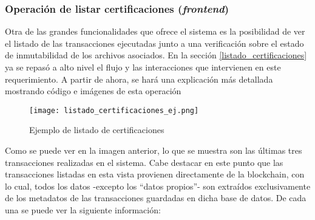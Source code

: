 \subsubsection{Operación de listar certificaciones (\textit{frontend})}

Otra de las grandes funcionalidades que ofrece el sistema es la posibilidad de ver el listado de las transacciones ejecutadas junto a una verificación sobre el estado de inmutabilidad de los archivos asociados. En la sección \ref{listado_certificaciones} ya se repasó a alto nivel el flujo y las interacciones que intervienen en este requerimiento. A partir de ahora, se hará una explicación más detallada mostrando código e imágenes de esta operación

\begin{figure}[H]
  \texttt{[image: listado\_certificaciones\_ej.png]}
  \centering
  \caption{Ejemplo de listado de certificaciones}
  \label{fig:listado-certificaciones}
\end{figure}

Como se puede ver en la imagen anterior, lo que se muestra son las últimas tres transacciones realizadas en el sistema. Cabe destacar en este punto que las transacciones listadas en esta vista provienen directamente de la blockchain, con lo cual, todos los datos -excepto los ``datos propios''- son extraídos exclusivamente de los metadatos de las transacciones guardadas en dicha base de datos. De cada una se puede ver la siguiente información:

